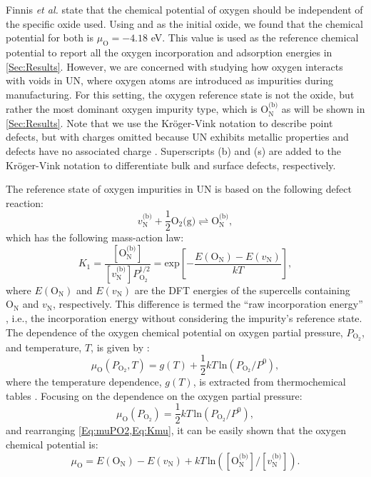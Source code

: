 \documentclass[preprint,12pt,sort&compress]{elsarticle}
\newcommand{\?}{\stackrel{?}{=}}
\begin{document}
Finnis \textit{et al.} state that the chemical potential of oxygen should be independent of the specific oxide used. Using  and  as the initial oxide, we found that the chemical potential for both is $\mu_\text{O} = - 4.18$ eV. This value is used as the reference chemical potential to report all the oxygen incorporation and adsorption energies in \cref{Sec:Results}. However, we are concerned with studying how oxygen interacts with voids in UN, where oxygen atoms are introduced as impurities during manufacturing. For this setting, the oxygen reference state is not the oxide, but rather the most dominant oxygen impurity type, which is $\text{O}_\text{N}^\text{(b)}$ as will be shown in \cref{Sec:Results}. Note that we use the Kröger-Vink notation \cite{Kroger1956} to describe point defects, but with charges omitted because UN exhibits metallic properties and defects have no associated charge \cite{Cooper2023}. Superscripts (b) and (s) are added to the Kröger-Vink notation to differentiate bulk and surface defects, respectively.

The reference state of oxygen impurities in UN is based on the following defect reaction:
\begin{equation}
v_\text{N}^\text{(b)} + \frac{1}{2} \text{O}_2 \text{(g)} \rightleftharpoons \text{O}_\text{N}^\text{(b)},
\end{equation}
which has the following mass-action law:
\begin{equation}
K_1 = \frac{ [ \text{O}_\text{N}^\text{(b)} ] }{ [ v_\text{N}^\text{(b)} ] P_{\text{O}_2}^{1/2} } = \text{exp}\! \left[ - \frac{E( \text{O}_\text{N} ) - E( v_\text{N} )}{kT} \right],
\label{Eq:Kmu}
\end{equation}
where $E( \text{O}_\text{N} )$ and $E( v_\text{N} )$ are the DFT energies of the supercells containing $\text{O}_\text{N}$ and $v_\text{N}$, respectively. This difference is termed the ``raw incorporation energy'' \cite{AbdulHameed2024}, i.e., the incorporation energy without considering the impurity's reference state. The dependence of the oxygen chemical potential on oxygen partial pressure, $P_{\text{O}_2}$, and temperature, $T$, is given by \cite{Finnis2005}:
\begin{equation}
\mu_\text{O}(P_{\text{O}_2}, T) = g(T) + \frac{1}{2} kT \, \text{ln} \!\left( P_{\text{O}_2} / P^0 \right),
\label{Eq:muTPO2}
\end{equation}
where the temperature dependence, $g(T)$, is extracted from thermochemical tables \cite{Linstrom2024}. Focusing on the dependence on the oxygen partial pressure:
\begin{equation}
\mu_\text{O}(P_{\text{O}_2}) = \frac{1}{2} kT \, \text{ln} \!\left( P_{\text{O}_2} / P^0 \right),
\label{Eq:muPO2}
\end{equation}
and rearranging \cref{Eq:muPO2,Eq:Kmu}, it can be easily shown that the oxygen chemical potential is:
\begin{equation}
\mu_\text{O} = E( \text{O}_\text{N} ) - E( v_\text{N} ) + kT \, \text{ln} \! \left( [ \text{O}_\text{N}^\text{(b)} ] / [ v_\text{N}^\text{(b)} ] \right).
\label{Eq:OxygenTruePot}
\end{equation}
\end{document}
